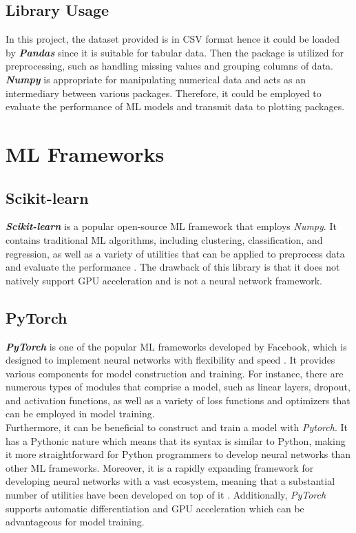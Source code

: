 \documentclass[12pt,twoside]{report}
\begin{document}
\subsection{Library Usage}
In this project, the dataset provided is in CSV format hence it could be loaded by \textbf{\textit{Pandas}} since it is suitable for tabular data. Then the package is utilized for preprocessing, such as handling missing values and grouping columns of data. 
\\

\textit{\textbf{Numpy}} is appropriate for manipulating numerical data and acts as an intermediary between various packages. Therefore, it could be employed to evaluate the performance of ML models and transmit data to plotting packages. 


\section{ML Frameworks}
\subsection{Scikit-learn}
\textit{\textbf{Scikit-learn}} is a popular open-source ML framework that employs \textit{Numpy}. It contains traditional ML algorithms, including clustering, classification, and regression, as well as a variety of utilities that can be applied to preprocess data and evaluate the performance \citep{RN7}. The drawback of this library is that it does not natively support GPU acceleration and is not a neural network framework. 

\subsection{PyTorch}
\textbf{\textit{PyTorch}} is one of the popular ML frameworks developed by Facebook, which is designed to implement neural networks with flexibility and speed \citep{RN5}. It provides various components for model construction and training. For instance, there are numerous types of modules that comprise a model, such as linear layers, dropout, and activation functions, as well as a variety of loss functions and optimizers that can be employed in model training. 
\\

Furthermore, it can be beneficial to construct and train a model with \textit{Pytorch}. It has a Pythonic nature which means that its syntax is similar to Python, making it more straightforward for Python programmers to develop neural networks than other ML frameworks. Moreover, it is a rapidly expanding framework for developing neural networks with a vast ecosystem, meaning that a substantial number of utilities have been developed on top of it \citep{RN5}. Additionally, \textit{PyTorch} supports automatic differentiation and GPU acceleration which can be advantageous for model training.
\end{document}
